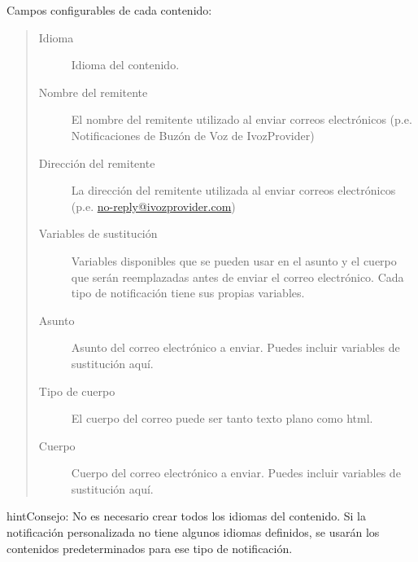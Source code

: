 \documentclass[letterpaper,10pt,spanish]{sphinxmanual}
\begin{document}
Campos configurables de cada contenido:
\begin{quote}
\begin{description}
\item[{Idioma}] \leavevmode
Idioma del contenido.

\item[{Nombre del remitente}] \leavevmode
El nombre del remitente utilizado al enviar correos electrónicos (p.e. Notificaciones de Buzón de Voz de IvozProvider)

\item[{Dirección del remitente}] \leavevmode
La dirección del remitente utilizada al enviar correos electrónicos (p.e. \href{mailto:no-reply@ivozprovider.com}{no-reply@ivozprovider.com})

\item[{Variables de sustitución}] \leavevmode
Variables disponibles que se pueden usar en el asunto y el cuerpo que serán reemplazadas antes de enviar el correo electrónico. Cada tipo de notificación tiene sus propias variables.

\item[{Asunto}] \leavevmode
Asunto del correo electrónico a enviar. Puedes incluir variables de sustitución aquí.

\item[{Tipo de cuerpo}] \leavevmode
El cuerpo del correo puede ser tanto texto plano como html.

\item[{Cuerpo}] \leavevmode
Cuerpo del correo electrónico a enviar. Puedes incluir variables de sustitución aquí.

\end{description}
\end{quote}

\begin{notice}{hint}{Consejo:}
No es necesario crear todos los idiomas del contenido. Si la notificación personalizada no tiene algunos idiomas definidos, se usarán los contenidos predeterminados para ese tipo de notificación.
\end{notice}
\end{document}
